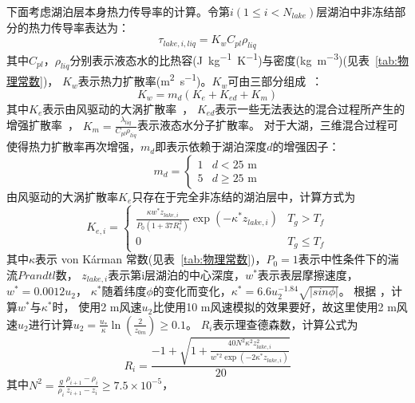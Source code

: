 下面考虑湖泊层本身热力传导率的计算。令第$i\left(1\le i<N_{lake}\right)$层湖泊中非冻结部分的热力传导率表达为：
\begin{equation}
\tau_{lake, i, liq}=K_{w} C_{p l} \rho_{liq}
\end{equation}
其中$C_{pl}$，$\rho_{liq}$分别表示液态水的比热容(\unit{J.kg^{-1}.K^{-1}})与密度(\unit{kg.m^{-3}})(见表~\ref{tab:物理常数})，
$K_w$表示热力扩散率(\unit{m^2.s^{-1}})。$K_w$可由三部分组成~\citep{subin2012improved}：
\begin{equation}
K_{w}=m_{d}\left(K_{e}+K_{ed}+K_{m}\right)
\end{equation}
其中$K_e$表示由风驱动的大涡扩散率~\citep{hostetler1990simulation}，
$K_{ed}$表示一些无法表达的混合过程所产生的增强扩散率~\citep{fang1996long}，
$K_m=\frac{\lambda_{liq}}{C_{pl}\rho_{liq}}$表示液态水分子扩散率。
对于大湖，三维混合过程可使得热力扩散率再次增强，$m_d$即表示依赖于湖泊深度$d$的增强因子：
\begin{equation}
m_{d}=\left\{\begin{array}{ll}1 & d<25 \text{ m} \\ 5 & d \geq 25 \text{ m}\end{array}\right.
\end{equation}
由风驱动的大涡扩散率$K_e$只存在于完全非冻结的湖泊层中，计算方式为
\begin{equation}
K_{e, i}=\left\{\begin{array}{ll}\frac{\kappa w^\ast z_{lake, i}}{P_{0}\left(1+37 R_{i}^{2}\right)} 
    \exp \left(-\kappa^{*} z_{lake, i}\right) & T_{g}>T_{f} \\ 0 & T_{g} \leq T_{f}\end{array}\right.
\end{equation}
其中$\kappa$表示 von K\'arman 常数(见表~\ref{tab:物理常数})，$P_0=1$表示中性条件下的湍流$Prandtl$数，
$z_{lake,i}$表示第i层湖泊的中心深度，$w^\ast$表示表层摩擦速度，$w^\ast=0.0012u_2$，
$\kappa^\ast$随着纬度$\phi$的变化而变化，$\kappa^\ast=6.6u_2^{-1.84}\sqrt{\left|sin\phi\right|}$。
根据 \citet{hostetler1990simulation}，计算$w^\ast$与$\kappa^\ast$时，
使用2 m风速$u_2$比使用10 m风速模拟的效果要好，故这里使用2 m风速$u_2$进行计算$u_2=\frac{u_\ast}{\kappa}\ln{\left(\frac{2}{z_{0m}}\right)}\geq0.1$。
$R_i$表示理查德森数，计算公式为
\begin{equation}
R_{i}=\frac{-1+\sqrt{\left.1+\frac{40 N^{2} \kappa^{2} z_{lake, i}^{2}}{w^{\ast 2} \exp \left(-2 \kappa^{\ast} z_{lake, i}\right)}\right.}}{20}
\end{equation}
其中$N^2=\frac{g}{\rho_i}\frac{\rho_{i+1}-\rho_i}{z_{i+1}-z_i}\geq7.5\times{10}^{-5}$，
